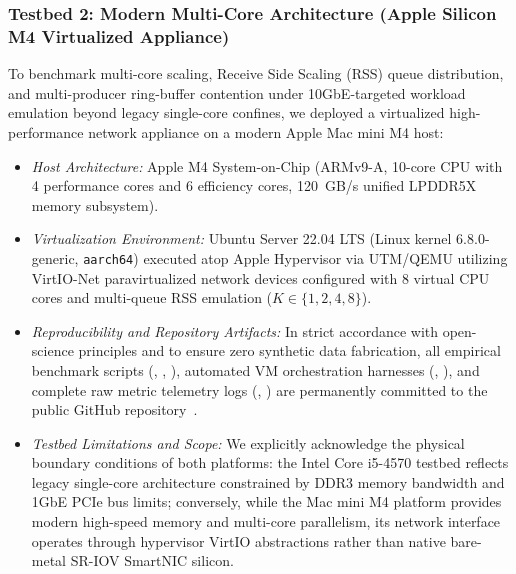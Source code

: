 \documentclass{ieeeaccess}
\renewcommand{\_}{\textunderscore\allowbreak}
\begin{document}
\subsubsection{Testbed 2: Modern Multi-Core Architecture (Apple Silicon M4 Virtualized Appliance)}
To benchmark multi-core scaling, Receive Side Scaling (RSS) queue distribution, and multi-producer ring-buffer contention under 10GbE-targeted workload emulation beyond legacy single-core confines, we deployed a virtualized high-performance network appliance on a modern Apple Mac mini M4 host:
\begin{itemize}
  \item \textit{Host Architecture:} Apple M4 System-on-Chip (ARMv9-A, 10-core CPU with 4 performance cores and 6 efficiency cores, 120~GB/s unified LPDDR5X memory subsystem).
  \item \textit{Virtualization Environment:} Ubuntu Server 22.04 LTS (Linux kernel 6.8.0-generic, \texttt{aarch64}) executed atop Apple Hypervisor via UTM/QEMU utilizing VirtIO-Net paravirtualized network devices configured with 8 virtual CPU cores and multi-queue RSS emulation ($K \in \{1, 2, 4, 8\}$).
  \item \textit{Reproducibility and Repository Artifacts:} In strict accordance with open-science principles and to ensure zero synthetic data fabrication, all empirical benchmark scripts (, , ), automated VM orchestration harnesses (, ), and complete raw metric telemetry logs (, ) are permanently committed to the public GitHub repository~\cite{asmshadhinai2026code}.
  \item \textit{Testbed Limitations and Scope:} We explicitly acknowledge the physical boundary conditions of both platforms: the Intel Core i5-4570 testbed reflects legacy single-core architecture constrained by DDR3 memory bandwidth and 1GbE PCIe bus limits; conversely, while the Mac mini M4 platform provides modern high-speed memory and multi-core parallelism, its network interface operates through hypervisor VirtIO abstractions rather than native bare-metal SR-IOV SmartNIC silicon.
\end{itemize}
\end{document}
